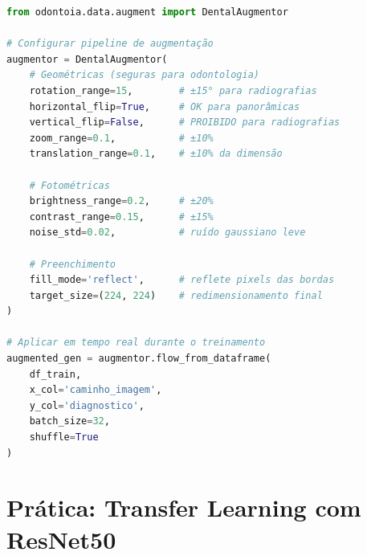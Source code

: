 \begin{lstlisting}[language=Python, caption={Configuração de aumento de dados
odontológico com odontoia.data.augment}, label={lst:augment}]
from odontoia.data.augment import DentalAugmentor

# Configurar pipeline de augmentação
augmentor = DentalAugmentor(
    # Geométricas (seguras para odontologia)
    rotation_range=15,        # ±15° para radiografias
    horizontal_flip=True,     # OK para panorâmicas
    vertical_flip=False,      # PROIBIDO para radiografias
    zoom_range=0.1,           # ±10%
    translation_range=0.1,    # ±10% da dimensão

    # Fotométricas
    brightness_range=0.2,     # ±20%
    contrast_range=0.15,      # ±15%
    noise_std=0.02,           # ruído gaussiano leve

    # Preenchimento
    fill_mode='reflect',      # reflete pixels das bordas
    target_size=(224, 224)    # redimensionamento final
)

# Aplicar em tempo real durante o treinamento
augmented_gen = augmentor.flow_from_dataframe(
    df_train,
    x_col='caminho_imagem',
    y_col='diagnostico',
    batch_size=32,
    shuffle=True
)
\end{lstlisting}


\section{Prática: Transfer Learning com ResNet50}
\label{sec:pratica-resnet50}

\niveltres

